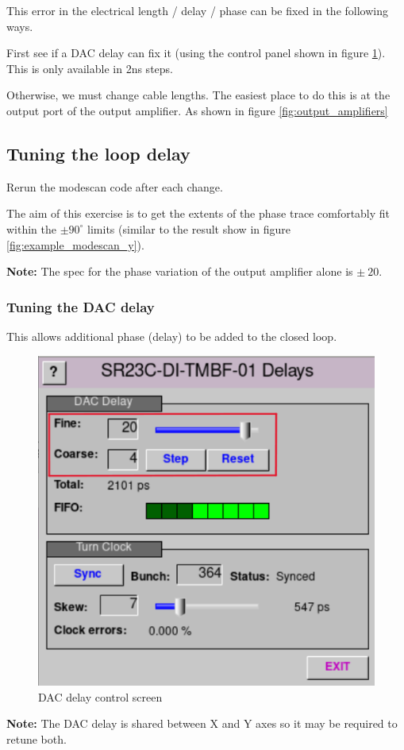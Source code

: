 \documentclass{report}
\begin{document}
This error in the electrical length / delay / phase can be fixed in the following ways. 

First see if a DAC delay can fix it (using the control panel shown in figure \ref{fig:DAC_delay_screen}). This is only available in 2ns steps.

Otherwise, we must change cable lengths. The easiest place to do this is at the output port of the output amplifier. As shown in figure \ref{fig:output_amplifiers}
\clearpage
\subsection{Tuning the loop delay} 

Rerun the modescan code after each change.

The aim of this exercise is to get the extents of the phase trace comfortably fit within the $\pm90^\circ$ limits (similar to the result show in figure \ref{fig:example_modescan_y}). 

\begin{tcolorbox}
\textbf{Note:} The spec for the phase variation of the output amplifier alone is $\pm~20$.
\end{tcolorbox}

\subsubsection{Tuning the DAC delay} 
This allows additional phase (delay) to be added to the closed loop.
\begin{figure}[ht]
    \centering
    \includegraphics[width=0.5\linewidth]{DAC_delay.png}
    \caption{DAC delay control screen}
    \label{fig:DAC_delay_screen}
\end{figure}
\begin{tcolorbox}
\textbf{Note:} The DAC delay is shared between X and Y axes so it may be required to retune both.
\end{tcolorbox}
\end{document}
